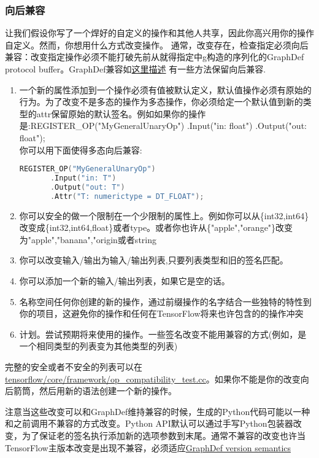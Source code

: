 \subsubsection{向后兼容}
让我们假设你写了一个焊好的自定义的操作和其他人共享，因此你高兴用你的操作自定义。然而，你想用什么方式改变操作。
通常，改变存在，检查指定必须向后兼容：改变指定操作必须不能打破先前从就得指定中g构造的序列化的GraphDef protocol buffer。GraphDef兼容如\href{https://www.tensorflow.org/programmers_guide/version_compat?hl=zh-cn#compatibility_of_graphs_and_checkpoints}{这里描述}
有一些方法保留向后兼容.
\begin{enumerate}
\item 一个新的属性添加到一个操作必须有值被默认定义，默认值操作必须有原始的行为。为了改变不是多态的操作为多态操作，你必须给定一个默认值到新的类型的attr保留原始的默认签名。例如如果你的操作是:REGISTER_OP("MyGeneralUnaryOp") .Input("in: float") .Output("out: float");\\
你可以用下面使得多态向后兼容:
\begin{lstlisting}[language=C++]
  REGISTER_OP("MyGeneralUnaryOp")
       .Input("in: T")
       .Output("out: T")
       .Attr("T: numerictype = DT_FLOAT");

\end{lstlisting}
\item 你可以安全的做一个限制在一个少限制的属性上。例如你可以从\{int32,int64\}改变成\{int32,int64,float\}或者type。或者你也许从\{"apple","orange"\}改变为{"apple","banana","origin}或者string
\item 你可以改变输入/输出为输入/输出列表,只要列表类型和旧的签名匹配。
\item 你可以添加一个新的输入/输出列表，如果它是空的话。
\item 名称空间任何你创建的新的操作，通过前缀操作的名字结合一些独特的特性到你的项目，这避免你的操作和任何在TensorFlow将来也许包含的的操作冲突
\item 计划。尝试预期将来使用的操作。一些签名改变不能用兼容的方式(例如，是一个相同类型的列表变为其他类型的列表)
\end{enumerate}
完整的安全或者不安全的列表可以在\href{https://www.github.com/tensorflow/tensorflow/blob/r1.4/tensorflow/core/framework/op_compatibility_test.cc}{tensorflow/core/framework/op_compatibility_test.cc}。如果你不能是你的改变向后箭筒，然后用新的语法创建一个新的操作。

注意当这些改变可以和GraphDef维持兼容的时候，生成的Python代码可能以一种和之前调用不兼容的方式改变。Python API默认可以通过手写Python包装器改变，为了保证老的签名执行添加新的选项参数到末尾。通常不兼容的改变也许当TensorFlow主版本改变是出现不兼容，必须适应\href{https://www.tensorflow.org/programmers_guide/version_compat?hl=zh-cn#compatibility_of_graphs_and_checkpoints}{GraphDef version semantics}
